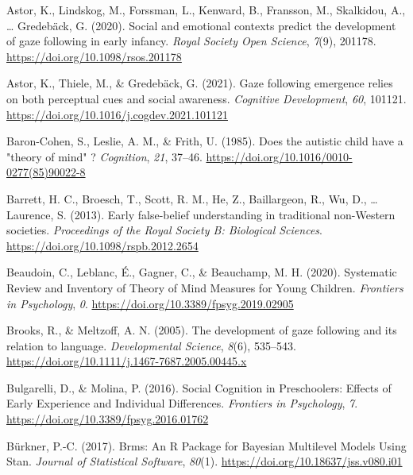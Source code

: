 \documentclass[
  man,floatsintext]{apa6}
\newlength{\cslhangindent}
\newlength{\cslentryspacingunit} %
\newenvironment{CSLReferences}[2] %
 {%
  \setlength{\parindent}{0pt}
  \ifodd #1
  \let\oldpar\par
  \def\par{\hangindent=\cslhangindent\oldpar}
  \fi
  \setlength{\parskip}{#2\cslentryspacingunit}
 }%
 {}
\begin{document}
\hypertarget{refs}{}
\begin{CSLReferences}{1}{0}
\leavevmode{}%
Astor, K., Lindskog, M., Forssman, L., Kenward, B., Fransson, M., Skalkidou, A., \ldots{} Gredebäck, G. (2020). Social and emotional contexts predict the development of gaze following in early infancy. \emph{Royal Society Open Science}, \emph{7}(9), 201178. \url{https://doi.org/10.1098/rsos.201178}

\leavevmode{}%
Astor, K., Thiele, M., \& Gredebäck, G. (2021). Gaze following emergence relies on both perceptual cues and social awareness. \emph{Cognitive Development}, \emph{60}, 101121. \url{https://doi.org/10.1016/j.cogdev.2021.101121}

\leavevmode{}%
Baron-Cohen, S., Leslie, A. M., \& Frith, U. (1985). Does the autistic child have a "theory of mind" ? \emph{Cognition}, \emph{21}, 37--46. \url{https://doi.org/10.1016/0010-0277(85)90022-8}

\leavevmode{}%
Barrett, H. C., Broesch, T., Scott, R. M., He, Z., Baillargeon, R., Wu, D., \ldots{} Laurence, S. (2013). Early false-belief understanding in traditional non-{Western} societies. \emph{Proceedings of the Royal Society B: Biological Sciences}. \url{https://doi.org/10.1098/rspb.2012.2654}

\leavevmode{}%
Beaudoin, C., Leblanc, É., Gagner, C., \& Beauchamp, M. H. (2020). Systematic {Review} and {Inventory} of {Theory} of {Mind Measures} for {Young Children}. \emph{Frontiers in Psychology}, \emph{0}. \url{https://doi.org/10.3389/fpsyg.2019.02905}

\leavevmode{}%
Brooks, R., \& Meltzoff, A. N. (2005). The development of gaze following and its relation to language. \emph{Developmental Science}, \emph{8}(6), 535--543. \url{https://doi.org/10.1111/j.1467-7687.2005.00445.x}

\leavevmode{}%
Bulgarelli, D., \& Molina, P. (2016). Social {Cognition} in {Preschoolers}: {Effects} of {Early Experience} and {Individual Differences}. \emph{Frontiers in Psychology}, \emph{7}. \url{https://doi.org/10.3389/fpsyg.2016.01762}

\leavevmode{}%
Bürkner, P.-C. (2017). Brms: {An R Package} for {Bayesian Multilevel Models Using Stan}. \emph{Journal of Statistical Software}, \emph{80}(1). \url{https://doi.org/10.18637/jss.v080.i01}


\end{CSLReferences}
\end{document}
